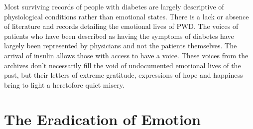 \documentclass[12pt]{article}
\begin{document}
Most surviving records of people with diabetes are largely descriptive of physiological conditions rather than emotional states. There is a lack or absence of literature and records detailing the emotional lives of PWD. The voices of patients who have been described as having the symptoms of diabetes have largely been represented by physicians and not the patients themselves.  The arrival of insulin allows those with access to have a voice. These voices from the archives don't necessarily fill the void of undocumented emotional lives of the past, but their letters of extreme gratitude, expressions of hope and happiness bring to light a heretofore quiet misery. 

\section{The Eradication of Emotion} 
\doublespacing
\end{document}
